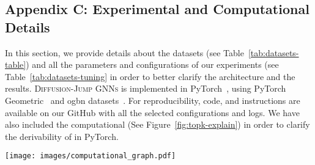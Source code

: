 \documentclass{article}
\theoremstyle{plain}
\theoremstyle{definition}
\begin{document}
\subsection{Appendix C: Experimental and Computational Details}
In this section, we provide details about the datasets (see Table~\ref{tab:datasets-table}) and all the parameters and configurations of our experiments (see Table~\ref{tab:datasets-tuning} in order to better clarify the architecture and the results. \textsc{Diffusion-Jump GNNs} is implemented in PyTorch~\citep{pytorch}, using PyTorch Geometric~\citep{pyg} and ogbn datasets~\citep{ogbn}. For reproducibility, code, and instructions are available on our GitHub with all the selected configurations and logs. We have also included the computational (See Figure~\ref{fig:topk-explain}) in order to clarify the derivability of  in PyTorch.
\begin{figure*}[ht]
\begin{center}
\centerline{\texttt{[image: images/computational\_graph.pdf]}}
    \caption{The Computational Graph for  jumps. All branches depend on the diffusion pump (top-left) except  (the Homophily Branch, top-right).}
    \label{fig:topk-explain}
\end{center}
\end{figure*} 
\end{document}
